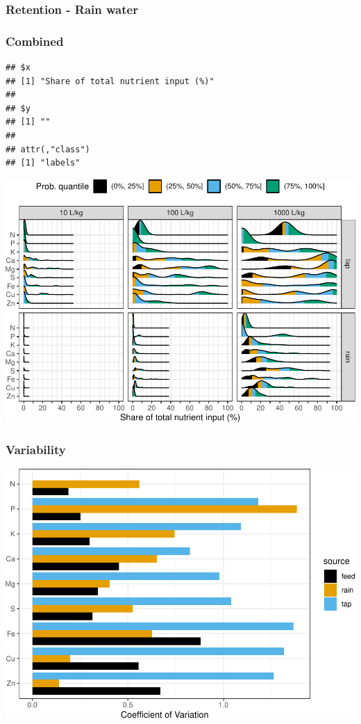 \documentclass[
]{article}
\begin{document}
\hypertarget{retention---rain-water}{%
\subsubsection{Retention - Rain water}\label{retention---rain-water}}

\hypertarget{combined-1}{%
\subsubsection{Combined}\label{combined-1}}

\begin{verbatim}
## $x
## [1] "Share of total nutrient input (%)"
## 
## $y
## [1] ""
## 
## attr(,"class")
## [1] "labels"
\end{verbatim}

\includegraphics{analysis_files/figure-latex/unnamed-chunk-57-1.pdf}

\hypertarget{variability}{%
\subsubsection{Variability}\label{variability}}

\includegraphics{analysis_files/figure-latex/plot_variability-1.pdf}
\end{document}
